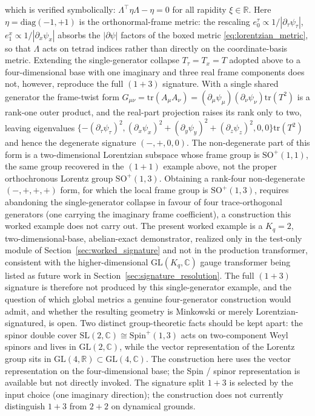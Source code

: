 \documentclass[11pt]{article}
\begin{document}
which is verified symbolically: $\Lambda^\top \eta\Lambda - \eta = 0$ for all rapidity $\xi \in \mathbb{R}$. Here $\eta = \mathrm{diag}(-1, +1)$ is the orthonormal-frame metric: the rescaling $e_0^\tau \propto 1/|\partial_\tau\psi_\tau|$, $e_1^x \propto 1/|\partial_x\psi_x|$ absorbs the $|\partial\psi|$ factors of the boxed metric \eqref{eq:lorentzian_metric}, so that $\Lambda$ acts on tetrad indices rather than directly on the coordinate-basis metric. Extending the single-generator collapse $T_\tau = T_x = T$ adopted above to a four-dimensional base with one imaginary and three real frame components does not, however, reproduce the full $(1{+}3)$ signature. With a single shared generator the frame-twist form $G_{\mu\nu} = \mathrm{tr}(A_\mu A_\nu) = (\partial_\mu \psi_\mu)(\partial_\nu \psi_\nu)\mathrm{tr}(T^2)$ is a rank-one outer product, and the real-part projection raises its rank only to two, leaving eigenvalues $\{-(\partial_\tau\psi_\tau)^2, (\partial_x\psi_x)^2 + (\partial_y\psi_y)^2 + (\partial_z\psi_z)^2, 0, 0\}\mathrm{tr}(T^2)$ and hence the degenerate signature $(-,+,0,0)$. The non-degenerate part of this form is a two-dimensional Lorentzian subspace whose frame group is $\mathrm{SO}^+(1,1)$, the same group recovered in the $(1{+}1)$ example above, not the proper orthochronous Lorentz group $\mathrm{SO}^+(1,3)$. Obtaining a rank-four non-degenerate $(-,+,+,+)$ form, for which the local frame group is $\mathrm{SO}^+(1,3)$, requires abandoning the single-generator collapse in favour of four trace-orthogonal generators (one carrying the imaginary frame coefficient), a construction this worked example does not carry out. The present worked example is a $K_q=2$, two-dimensional-base, abelian-exact demonstrator, realized only in the test-only module of Section~\ref{sec:worked_signature} and not in the production transformer, consistent with the higher-dimensional $\mathrm{GL}(K_q,\mathbb{C})$ gauge transformer being listed as future work in Section~\ref{sec:signature_resolution}. The full $(1{+}3)$ signature is therefore not produced by this single-generator example, and the question of which global metrics a genuine four-generator construction would admit, and whether the resulting geometry is Minkowski or merely Lorentzian-signatured, is open. Two distinct group-theoretic facts should be kept apart: the spinor double cover $\mathrm{SL}(2,\mathbb{C}) \cong \mathrm{Spin}^+(1,3)$ acts on two-component Weyl spinors and lives in $\mathrm{GL}(2,\mathbb{C})$, while the vector representation of the Lorentz group sits in $\mathrm{GL}(4,\mathbb{R}) \subset \mathrm{GL}(4,\mathbb{C})$. The construction here uses the vector representation on the four-dimensional base; the Spin / spinor representation is available but not directly invoked. The signature split $1{+}3$ is selected by the input choice (one imaginary direction); the construction does not currently distinguish $1{+}3$ from $2{+}2$ on dynamical grounds.
\end{document}
